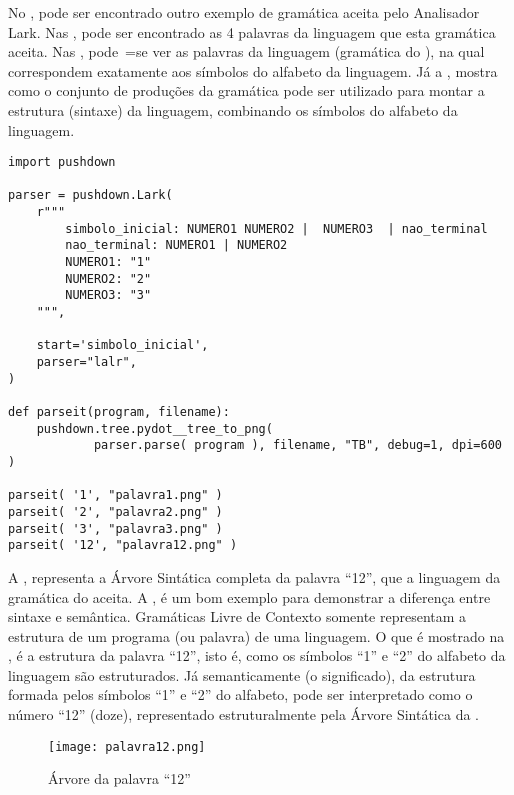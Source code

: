 No ,
pode ser encontrado outro exemplo de gramática aceita pelo Analisador Lark.
Nas ,
pode ser encontrado as 4 palavras da linguagem que esta gramática aceita.
Nas ,
pode~=se ver as palavras da linguagem (gramática do ),
na qual correspondem exatamente aos símbolos do alfabeto da linguagem.
Já a ,
mostra como o conjunto de produções da gramática pode ser utilizado para montar a estrutura (sintaxe) da linguagem,
combinando os símbolos do alfabeto da linguagem.
\begin{code}
\caption{Exemplo de Gramática com uma Estrutura de Sintaxe}
\label{code:ExemploDeEstruturaDeGramaticaLark}
\begin{verbatim}
import pushdown

parser = pushdown.Lark(
    r"""
        simbolo_inicial: NUMERO1 NUMERO2 |  NUMERO3  | nao_terminal
        nao_terminal: NUMERO1 | NUMERO2
        NUMERO1: "1"
        NUMERO2: "2"
        NUMERO3: "3"
    """,

    start='simbolo_inicial',
    parser="lalr",
)

def parseit(program, filename):
    pushdown.tree.pydot__tree_to_png(
            parser.parse( program ), filename, "TB", debug=1, dpi=600 )

parseit( '1', "palavra1.png" )
parseit( '2', "palavra2.png" )
parseit( '3', "palavra3.png" )
parseit( '12', "palavra12.png" )
\end{verbatim}
\end{code}

A ,
representa a Árvore Sintática completa da palavra ``12'',
que a linguagem da gramática do  aceita.
A ,
é um bom exemplo para demonstrar a diferença entre sintaxe e
semântica.
Gramáticas Livre de Contexto somente representam a estrutura de um programa (ou palavra) de uma linguagem.
O que é mostrado na ,
é a estrutura da palavra ``12'',
isto é,
como os símbolos ``1'' e
``2'' do alfabeto da linguagem são estruturados.
Já semanticamente (o significado),
da estrutura formada pelos símbolos ``1'' e
``2'' do alfabeto,
pode ser interpretado como o número ``12'' (doze),
representado estruturalmente pela Árvore Sintática da .
\begin{figure}[H]
\caption{Árvore da palavra ``12''}
\label{Figure:palavra12}
\centering
\texttt{[image: palavra12.png]}
\end{figure}

